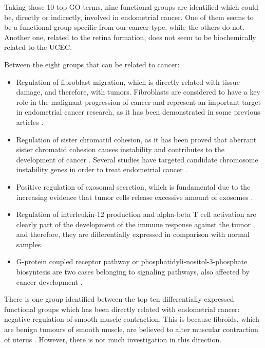 \documentclass[9pt,twocolumn,twoside]{gsajnl}
\begin{document}
Taking those 10 top GO terms, nine functional groups are identified  which could be, directly or indirectly, involved in endometrial cancer. One of them seems to be a functional group specific from our cancer type, while the others do not. Another one, related to the retina formation, does not seem to be biochemically related to the UCEC. 

Between the eight groups that can be related to cancer:
\begin{itemize}
  \item Regulation of fibroblast migration, which is directly related with tissue damage, and therefore, with tumors. Fibroblasts are considered to have a key role in the malignant progression of cancer and represent an important target in endometrial cancer research, as it has been demonstrated in some previous articles \citep{Subramaniam2013, Teng2016, Turner2010}.
  \item Regulation of sister chromatid cohesion, as it has been proved that aberrant sister chromatid cohesion causes instability and contributes to the development of cancer \citep{LeGallo2012}. Several studies have targeted candidate chromosome instability genes in order to treat endometrial cancer \citep{Price2013}.
  \item Positive regulation of exosomal secretion, which is fundamental due to the increasing evidence that tumor cells release excessive amount of exosomes \citep{Zhang2015}.
  \item Regulation of interleukin-12 production and alpha-beta T cell activation are clearly part of the development of the immune response against the tumor \citep{Colombo2002, Martin-Orozco2009}, and therefore, they are differentially expressed in comparison with normal samples. 
  \item G-protein coupled receptor pathway or phosphatidyli-nositol-3-phosphate biosyntesis are two cases belonging to signaling pathways, also affected by cancer development \citep{Li2005, Wang2006}.
\end{itemize}

There is one group identified between the top ten differentially expressed functional groups which has been directly related with endometrial cancer: negative regulation of smooth muscle contraction. This is because fibroids, which are benign tumours of smooth muscle, are believed to alter muscular contraction of uterus \citep{GeorgetownUniversityHospital}. However, there is not much investigation in this direction.
\end{document}
